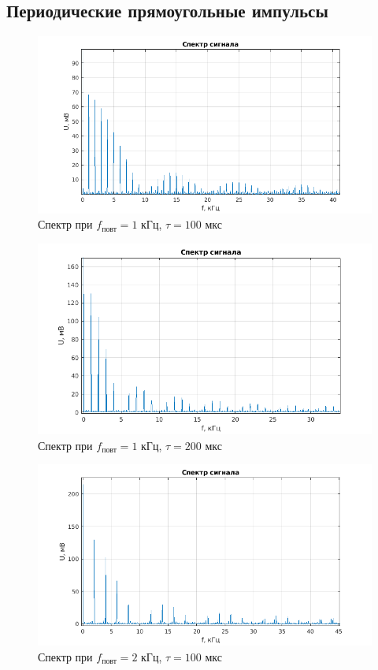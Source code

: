 \documentclass[a4paper, 12pt]{article}%
\begin{document}
\subsection{Периодические прямоугольные импульсы}

\begin{figure}[h!]
    \centering
    \includegraphics[width = 14 cm]{images/1_100_1.png}
    \caption{Спектр при $f_{\text{повт}} = 1$ кГц, $\tau = 100$ мкс}
\end{figure}

\begin{figure}[h!]
    \centering
    \includegraphics[width = 14 cm]{images/1_200_1.png}
    \caption{Спектр при $f_{\text{повт}} = 1$ кГц, $\tau = 200$ мкс}
\end{figure}

\begin{figure}[h!]
    \centering
    \includegraphics[width = 14 cm]{images/1_100_2.png}
    \caption{Спектр при $f_{\text{повт}} = 2$ кГц, $\tau = 100$ мкс}
\end{figure}
\end{document}
